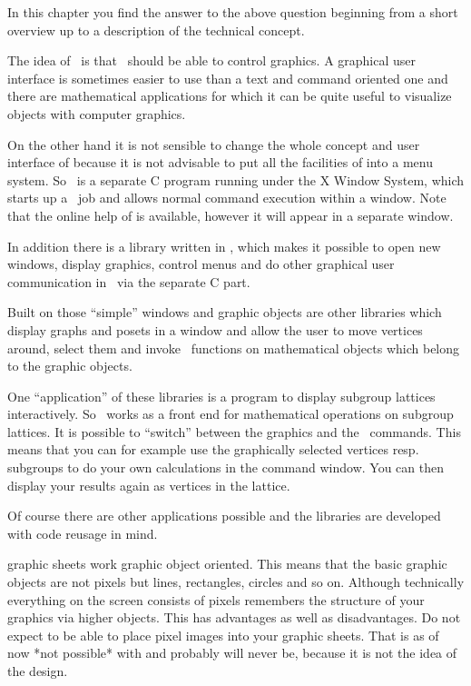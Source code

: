 
In this chapter you find the answer to the above question beginning from a
short overview up to a description of the technical concept.


The idea of \XGAP~is that \GAP~should be able to control graphics. A
graphical user interface is sometimes easier to use than a text and
command oriented one and there are mathematical applications for which it
can be quite useful to visualize objects with computer graphics.

On the other hand it is not sensible to change the whole concept and user
interface of {\GAP} because it is not advisable to put all the facilities of
{\GAP} into a menu system. So \XGAP~is a separate C program running under the
X Window System, which starts up a \GAP~job and allows normal command
execution within a window. Note that the online help of {\GAP} is
available,  however it will appear in a separate window.

In addition there is a library written in \GAP, which makes it
possible to open new windows, display graphics, control menus and do
other graphical user communication in \GAP~via the separate C part.

Built on those ``simple'' windows and graphic objects are other libraries
which display graphs and posets in a window and allow the user to move
vertices around, select them and invoke \GAP~functions on mathematical
objects which belong to the graphic objects.

One ``application'' of these libraries is a program to display subgroup
lattices interactively. So \XGAP~works as a front end for mathematical
operations on subgroup lattices. It is possible to ``switch'' between the
graphics and the \GAP~commands. This means that you can for example use the 
graphically selected vertices resp. subgroups to do your own calculations
in the command window. You can then display your results again as vertices
in the lattice.

Of course there are other applications possible and the libraries are
developed with code reusage in mind.


{\XGAP} graphic sheets work graphic object oriented. This means that the
basic graphic objects are not pixels but lines, rectangles, circles and so
on. Although technically everything on the screen consists of pixels
{\XGAP} remembers the structure of your graphics via higher objects. This
has advantages as well as disadvantages. Do not expect to be able to
place pixel images into your {\XGAP} graphic sheets. That is as of now
*not possible* with {\XGAP} and probably will never be, because it is not
the idea of the design. 

